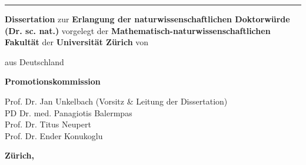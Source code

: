 \documentclass[\relativeRoot/main.tex]{subfiles}
\begin{document}
    \begin{titlepage}
        \begin{center}
            \begin{minipage}{1.0\textwidth}
                \centering
                \Large\sc
                \thetitle
            \end{minipage} 
            \vspace{4mm}

            \hrule
            \vspace{2cm}

            \textbf{Dissertation} \vfill
            zur \vfill
            \textbf{Erlangung der naturwissenschaftlichen Doktorwürde} \\
            \textbf{(Dr. sc. nat.)} \vfill
            vorgelegt der \vfill
            \textbf{Mathematisch-naturwissenschaftlichen Fakultät} \vfill
            der \vfill
            \textbf{Universität Zürich} \vfill
            von
            
            \vspace{4cm}

            {\large\sc \theauthor} \vfill
            aus \vfill
            {\large\sc Deutschland}
            
            \vspace{3cm}
            
            \textbf{Promotionskommission} \vfill
            \hspace{0.15\textwidth} \begin{minipage}{0.75\textwidth}
                Prof. Dr. Jan Unkelbach {\small (Vorsitz \& Leitung der Dissertation)}\\
                PD Dr. med. Panagiotis Balermpas\\
                Prof. Dr. Titus Neupert\\
                Prof. Dr. Ender Konukoglu
            \end{minipage} 

            \vspace{1cm}
            \textbf{Zürich, \thedate}
                
        \end{center}
    \end{titlepage}
\end{document}

